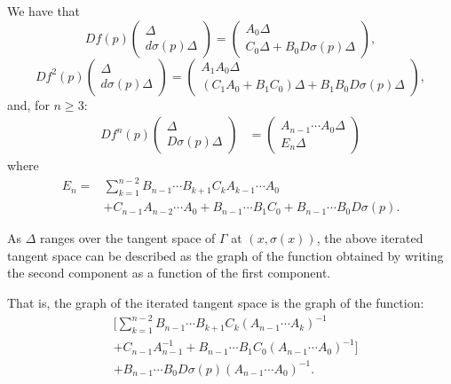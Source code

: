 \documentclass[11pt]{amsart}
\theoremstyle{definition}
\theoremstyle{remark}
\numberwithin{equation}{section}
\begin{document}
We have that
\[
Df(p) \begin{pmatrix} \Delta \\ d\sigma(p) \Delta
\end{pmatrix}
= \begin{pmatrix}  A_0 \Delta \\
C_0 \Delta   + B_{0} D \sigma(p) \Delta
\end{pmatrix},
\]
\[
Df^2(p) \begin{pmatrix} \Delta \\ d\sigma(p) \Delta
\end{pmatrix}
= \begin{pmatrix} A_{1} A_0 \Delta \\
 (C_1 A_{0}+  B_1 C_0)\Delta+B_1B_0 D \sigma(p) \Delta
\end{pmatrix},
\]
and, for $n \ge 3$:
\[
\begin{split}
Df^n(p) \begin{pmatrix} \Delta \\ D\sigma(p) \Delta
\end{pmatrix}
&= \begin{pmatrix} A_{n-1} \cdots A_0 \Delta \\
 E_n\Delta
     \end{pmatrix}
\end{split}
\]
where
\[\begin{split}
E_n=& \sum_{k=1}^{n-2} B_{n-1} \cdots B_{k+1} C_k A_{k-1} \cdots A_0\\
&+  C_{n-1}  A_{n-2} \cdots A_0
+ B_{n-1} \cdots B_1 C_0
+ B_{n-1} \cdots B_0 D \sigma(p) .
\end{split}\]

As $\Delta$ ranges over the tangent space of $\Gamma$
at $(x,\sigma(x))$, the above  iterated tangent space
can be described as the graph of
the function obtained by writing the
second component as a function of the first component.

That is, the graph of the iterated
tangent space is the graph of the function:
\begin{equation}\label{new_graph}
\begin{split}
& \Big[ \sum_{k=1}^{n-2} B_{n-1} \cdots B_{k+1} C_k (A_{n-1} \cdots A_k)^{-1} \\
&    +C_{n-1}A_{n-1}^{-1}+
  B_{n-1} \cdots B_1 C_0 (A_{n-1} \cdots A_0)^{-1}\Big]\\
&  + B_{n-1} \cdots B_0 D \sigma(p) (A_{n-1} \cdots A_0)^{-1} .
\end{split}
\end{equation}
\end{document}
